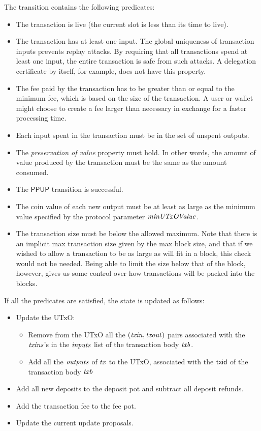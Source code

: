 The transition contains the following predicates:

\begin{itemize}
  \item
    The transaction is live (the current slot is less than its time to live).
  \item
    The transaction has at least one input.
    The global uniqueness of transaction inputs prevents replay attacks.
    By requiring that all transactions spend at least one input,
    the entire transaction is safe from such attacks.
    A delegation certificate by itself, for example, does not have this property.
  \item
    The fee paid by the transaction has to be greater than or equal to the minimum fee,
    which is based on the size of the transaction.
    A user or wallet might choose to create a fee larger than necessary
    in exchange for a faster processing time.
  \item
    Each input spent in the transaction must be in the set of unspent
    outputs.
  \item
    The \textit{preservation of value} property must hold.
    In other words, the amount of value produced by the transaction must be the same as
    the amount consumed.
  \item
    The $\mathsf{PPUP}$ transition is successful.
  \item
    The coin value of each new output must be at least as large as the
    minimum value specified by the protocol parameter $\mathit{minUTxOValue}$.
  \item
    The transaction size must be below the allowed maximum.
    Note that there is an implicit max transaction size given by the max block size,
    and that if we wished to allow a transaction to be as large as will fit in a block, this
    check would not be needed.
    Being able to limit the size below that of the block, however, gives us some
    control over how transactions will be packed into the blocks.
\end{itemize}
If all the predicates are satisfied, the state is updated as follows:

\begin{itemize}
  \item Update the UTxO:
    \begin{itemize}
      \item Remove from the UTxO all the $(\mathit{txin}, \mathit{txout})$ pairs
        associated with the $\mathit{txins}$'s in the $\mathit{inputs}$ list of
        the transaction body $\mathit{txb}$.
      \item Add all the $\mathit{outputs}$ of $\mathit{tx}$ to the
        UTxO, associated with the $\mathsf{txid}$ of the transaction body $\mathit{txb}$
    \end{itemize}
  \item Add all new deposits to the deposit pot and subtract all deposit refunds.
  \item Add the transaction fee to the fee pot.
  \item Update the current update proposals.
\end{itemize}

